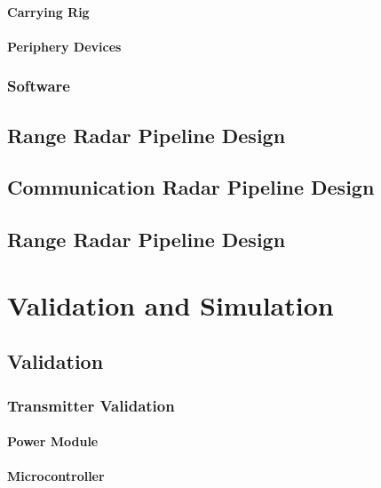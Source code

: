 \documentclass[11pt]{report}
\begin{document}
\subsubsection{Carrying Rig}




\subsubsection{Periphery Devices}

\subsection{Software}

\section{Range Radar Pipeline Design}
\section{Communication Radar Pipeline Design}
\section{Range Radar Pipeline Design}





\chapter{Validation and Simulation}


\section{Validation}

\subsection{Transmitter Validation}
\subsubsection{Power Module}

\subsubsection{Microcontroller}
\end{document}

